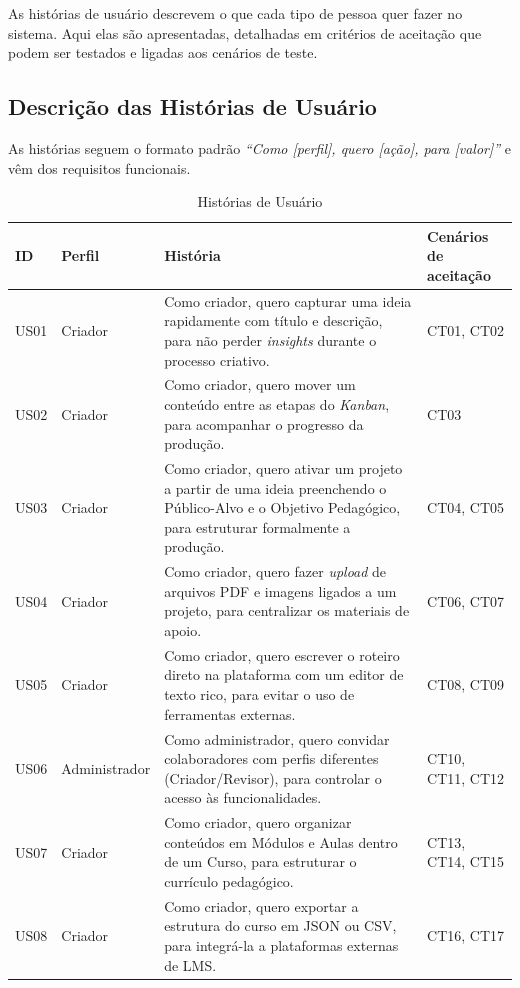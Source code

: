 As histórias de usuário descrevem o que cada tipo de pessoa quer fazer no sistema. Aqui elas são apresentadas, detalhadas em critérios de aceitação que podem ser testados e ligadas aos cenários de teste.

\subsection{Descrição das Histórias de Usuário}

As histórias seguem o formato padrão \textit{``Como [perfil], quero [ação], para [valor]''} e vêm dos requisitos funcionais.

\begin{table}[H]
\centering
\caption{Histórias de Usuário}
\label{tab:historias}
\small
\begin{tabular}{|p{0.9cm}|p{2.2cm}|p{7.2cm}|p{3cm}|}
\hline
\textbf{ID} & \textbf{Perfil} & \textbf{História} & \textbf{Cenários de aceitação} \\
\hline
US01 & Criador & Como criador, quero capturar uma ideia rapidamente com título e descrição, para não perder \textit{insights} durante o processo criativo. & CT01, CT02 \\
\hline
US02 & Criador & Como criador, quero mover um conteúdo entre as etapas do \textit{Kanban}, para acompanhar o progresso da produção. & CT03 \\
\hline
US03 & Criador & Como criador, quero ativar um projeto a partir de uma ideia preenchendo o Público-Alvo e o Objetivo Pedagógico, para estruturar formalmente a produção. & CT04, CT05 \\
\hline
US04 & Criador & Como criador, quero fazer \textit{upload} de arquivos PDF e imagens ligados a um projeto, para centralizar os materiais de apoio. & CT06, CT07 \\
\hline
US05 & Criador & Como criador, quero escrever o roteiro direto na plataforma com um editor de texto rico, para evitar o uso de ferramentas externas. & CT08, CT09 \\
\hline
US06 & Administrador & Como administrador, quero convidar colaboradores com perfis diferentes (Criador/Revisor), para controlar o acesso às funcionalidades. & CT10, CT11, CT12 \\
\hline
US07 & Criador & Como criador, quero organizar conteúdos em Módulos e Aulas dentro de um Curso, para estruturar o currículo pedagógico. & CT13, CT14, CT15 \\
\hline
US08 & Criador & Como criador, quero exportar a estrutura do curso em JSON ou CSV, para integrá-la a plataformas externas de LMS. & CT16, CT17 \\
\hline
\end{tabular}
\end{table}


